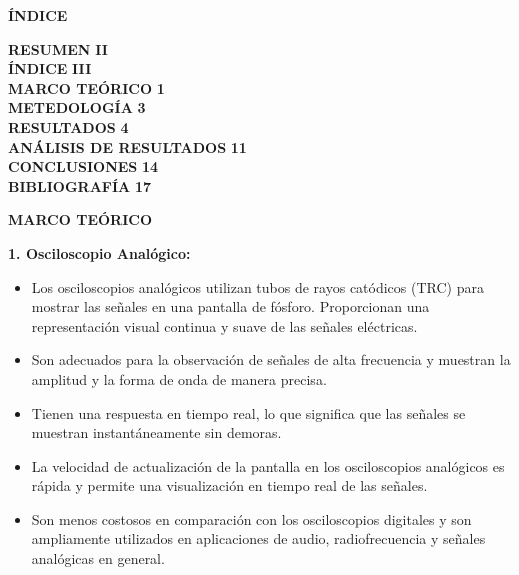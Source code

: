 \documentclass[12pt]{article}
\begin{document}
	\newpage
	
	\begin{center}
		\textbf{\large ÍNDICE}\\
	\end{center}
	
	\noindent \textbf{RESUMEN} \hfill \textbf{II}\\
	\noindent \textbf{ÍNDICE} \hfill \textbf{III}\\
	\noindent \textbf{MARCO TEÓRICO} \hfill \textbf{1}\\
	\noindent \textbf{METEDOLOGÍA} \hfill \textbf{3}\\
	\noindent \textbf{RESULTADOS} \hfill \textbf{4}\\
	\noindent \textbf{ANÁLISIS DE RESULTADOS} \hfill \textbf{11}\\
	\noindent \textbf{CONCLUSIONES} \hfill \textbf{14}\\
	\noindent \textbf{BIBLIOGRAFÍA} \hfill \textbf{17}\\
	
	\newpage
	
	
	\begin{center}
		\textbf{\large MARCO TEÓRICO}\\
	\end{center}
	
	\textbf{1. Osciloscopio Analógico:}

        \begin{itemize}
            \item Los osciloscopios analógicos utilizan tubos de rayos catódicos (TRC) para mostrar las señales en una pantalla de fósforo. Proporcionan una representación visual continua y suave de las señales eléctricas.
            \item Son adecuados para la observación de señales de alta frecuencia y muestran la amplitud y la forma de onda de manera precisa.
            \item Tienen una respuesta en tiempo real, lo que significa que las señales se muestran instantáneamente sin demoras.
            \item La velocidad de actualización de la pantalla en los osciloscopios analógicos es rápida y permite una visualización en tiempo real de las señales.
            \item Son menos costosos en comparación con los osciloscopios digitales y son ampliamente utilizados en aplicaciones de audio, radiofrecuencia y señales analógicas en general.
        \end{itemize}
        
\end{document}
